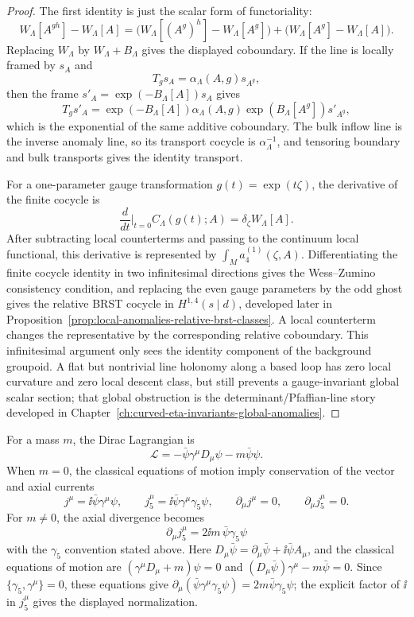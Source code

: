 \begin{proof}
The first identity is just the scalar form of functoriality:
\[
  W_\Lambda[A^{gh}]-W_\Lambda[A]
  =
  \bigl(W_\Lambda[(A^g)^h]-W_\Lambda[A^g]\bigr)
  +
  \bigl(W_\Lambda[A^g]-W_\Lambda[A]\bigr).
\]
Replacing \(W_\Lambda\) by \(W_\Lambda+B_\Lambda\) gives the displayed
coboundary.  If the line is locally framed by \(s_A\) and
\[
  T_gs_A=\alpha_\Lambda(A,g)s_{A^g},
\]
then the frame \(s'_A=\exp(-B_\Lambda[A])s_A\) gives
\[
  T_gs'_A
  =
  \exp(-B_\Lambda[A])\alpha_\Lambda(A,g)
  \exp(B_\Lambda[A^g])s'_{A^g},
\]
which is the exponential of the same additive coboundary.  The bulk inflow
line is the inverse anomaly line, so its transport cocycle is
\(\alpha_\Lambda^{-1}\), and tensoring boundary and bulk transports gives the
identity transport.

For a one-parameter gauge transformation \(g(t)=\exp(t\zeta)\), the derivative
of the finite cocycle is
\[
  \frac{d}{dt}\bigg|_{t=0}C_\Lambda(g(t);A)
  =
  \delta_\zeta W_\Lambda[A].
\]
After subtracting local counterterms and passing to the continuum local
functional, this derivative is represented by
\(\int_Ma_4^{(1)}(\zeta,A)\).  Differentiating the finite cocycle identity in
two infinitesimal directions gives the Wess--Zumino consistency condition,
and replacing the even gauge parameters by the odd ghost gives the relative
BRST cocycle in \(H^{1,4}(s\mid d)\), developed later in
Proposition~\ref{prop:local-anomalies-relative-brst-classes}.  A local
counterterm changes the representative by the corresponding relative
coboundary.  This infinitesimal argument only sees the identity component of
the background groupoid.  A flat but nontrivial line holonomy along a based
loop has zero local curvature and zero local descent class, but still
prevents a gauge-invariant global scalar section; that global obstruction is
the determinant/Pfaffian-line story developed in
Chapter~\ref{ch:curved-eta-invariants-global-anomalies}.
\end{proof}

For a mass \(m\), the Dirac Lagrangian is
\[
  \mathcal L
  =
  -\bar\psi\gamma^\mu D_\mu\psi
  -m\bar\psi\psi .
\]
When \(m=0\), the classical equations of motion imply conservation of the
vector and axial currents
\[
  j^\mu=\ii\bar\psi\gamma^\mu\psi,
  \qquad
  j_5^\mu=\ii\bar\psi\gamma^\mu\gamma_5\psi,
  \qquad
  \partial_\mu j^\mu=0,
  \qquad
  \partial_\mu j_5^\mu=0 .
\]
For \(m\neq0\), the axial divergence becomes
\[
  \partial_\mu j_5^\mu=2\ii m\,\bar\psi\gamma_5\psi
\]
with the \(\gamma_5\) convention stated above.
Here \(D_\mu\bar\psi=\partial_\mu\bar\psi+\ii\bar\psi A_\mu\), and the
classical equations of motion are
\((\gamma^\mu D_\mu+m)\psi=0\) and
\((D_\mu\bar\psi)\gamma^\mu-m\bar\psi=0\).  Since
\(\{\gamma_5,\gamma^\mu\}=0\), these equations give
\(\partial_\mu(\bar\psi\gamma^\mu\gamma_5\psi)=2m\bar\psi\gamma_5\psi\);
the explicit factor of \(\ii\) in \(j_5^\mu\) gives the displayed
normalization.

